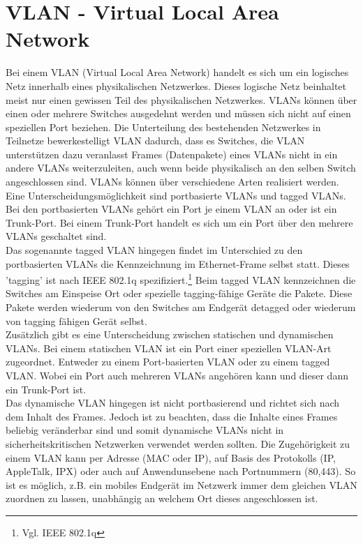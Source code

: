 \section{VLAN - Virtual Local Area Network}
\label{sec:vlan}

Bei einem VLAN (Virtual Local Area Network) handelt es sich um ein logisches Netz innerhalb eines physikalischen Netzwerkes. Dieses logische Netz beinhaltet meist nur einen gewissen Teil des physikalischen Netzwerkes. VLANs können über einen oder mehrere Switches ausgedehnt werden und müssen sich nicht auf einen speziellen Port beziehen. Die Unterteilung des bestehenden Netzwerkes in Teilnetze bewerkestelligt VLAN dadurch, dass es Switches, die VLAN unterstützen dazu veranlasst Frames (Datenpakete) eines VLANs nicht in ein andere VLANs weiterzuleiten, auch wenn beide physikalisch an den selben Switch angeschlossen sind.
VLANs können über verschiedene Arten realisiert werden. Eine Unterscheidungsmöglichkeit sind portbasierte VLANs und tagged VLANs.
Bei den portbasierten VLANs gehört ein Port je einem VLAN an oder ist ein Trunk-Port. Bei einem Trunk-Port handelt es sich um ein Port über den mehrere VLANs geschaltet sind.\\
Das sogenannte tagged VLAN hingegen findet im Unterschied zu den portbasierten VLANs die Kennzeichnung im Ethernet-Frame selbst statt. Dieses 'tagging' ist nach IEEE 802.1q spezifiziert.\footnote{Vgl. IEEE 802.1q}
Beim tagged VLAN kennzeichnen die Switches am Einspeise Ort oder spezielle tagging-fähige Geräte die Pakete. Diese Pakete werden wiederum von den Switches am Endgerät detagged oder wiederum von tagging fähigen Gerät selbst.\\
Zusätzlich gibt es eine Unterscheidung zwischen statischen und dynamischen VLANs.
Bei einem statischen VLAN ist ein Port einer speziellen VLAN-Art zugeordnet. Entweder zu einem Port-basierten VLAN oder zu einem tagged VLAN.
Wobei ein Port auch mehreren VLANs angehören kann und dieser dann ein Trunk-Port ist.\\
Das dynamische VLAN hingegen ist nicht portbasierend und richtet sich nach dem Inhalt des Frames. Jedoch ist zu beachten, dass die Inhalte eines Frames beliebig veränderbar sind und somit dynamische VLANs nicht in sicherheitskritischen Netzwerken verwendet werden sollten.
Die Zugehörigkeit zu einem VLAN kann per Adresse (MAC oder IP), auf Basis des Protokolls (IP, AppleTalk, IPX) oder auch auf Anwendunsebene nach Portnummern (80,443). So ist es möglich, z.B. ein mobiles Endgerät im Netzwerk immer dem gleichen VLAN zuordnen zu lassen, unabhängig an welchem Ort dieses angeschlossen ist.\\
